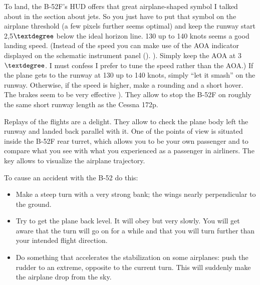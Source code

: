 To land, the B-52F's HUD offers that great airplane-shaped symbol I
talked about in the section about jets. So you just have to put that
symbol on the airplane threshold (a few pixels further seems optimal)
and keep the runway start 2,5$\textdegree$ below the ideal horizon
line. 130 up to 140 knots seems a good landing speed. (Instead of the
speed you can make use of the AOA indicator displayed on the schematic
instrument panel (). ). Simply keep the AOA at 3$\textdegree$. I
must confess I prefer to tune the speed rather than the AOA.) If the
plane gets to the runway at 130 up to 140 knots, simply ``let it
smash'' on the runway. Otherwise, if the speed is higher, make a
rounding and a short hover. The brakes seem to be very effective
). They allow to stop the B-52F on roughly the same short runway
length as the Cessna 172p.

Replays of the flights are a delight. They allow to check the plane
body left the runway and landed back parallel with it. One of the
points of view is situated inside the B-52F rear turret, which allows
you to be your own passenger and to compare what you see with what you
experienced as a passenger in airliners. The key  allows to
visualize the airplane trajectory.

To cause an accident with the B-52 do this:
\begin{itemize}
	\item Make a steep turn with a very strong bank; the wings nearly perpendicular to the ground.
	\item Try to get the plane back level. It will obey but very slowly. You will get aware that the turn will go on for a while and that you will turn further than your intended flight direction.
	\item Do something that accelerates the stabilization on some airplanes: push the rudder to an extreme, opposite to the current turn. This will suddenly make the airplane drop from the sky. 
\end{itemize}
